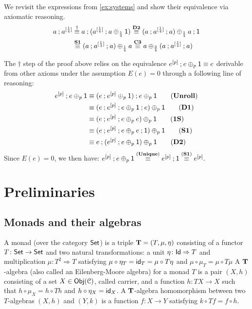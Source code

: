 \begin{example} We revisit the expressions from \cref{ex:systems} and show their equivalence via axiomatic reasoning.
\begin{align*}
     a \mathbin{;} a^{[\frac{1}{4}]} &\stackrel\dagger\equiv   a \mathbin{;} (a^{[\frac{1}{4}]} \mathbin{;} a \oplus_{\frac{1}{4}} \mathsf{1}) \stackrel{\textbf{D2}}\equiv  (a \mathbin{;} a^{[\frac{1}{4}]}\mathbin{;} a) \oplus_{\frac{1}{4}} a \mathbin{;} \mathsf{1}\\  &\stackrel{\textbf{S1}}\equiv (a \mathbin{;} a^{[\frac{1}{4}]}\mathbin{;} a) \oplus_{\frac{1}{4}} a \stackrel{\textbf{C3}}\equiv a \oplus_{\frac{3}{4}} (a \mathbin{;} a^{[\frac{1}{4}]}\mathbin{;} a)
\end{align*}

The $\dagger$ step of the proof above relies on the equivalence $e^{[p]}\mathbin{;} e \oplus_p \mathsf{1} \equiv e$ derivable from other axioms under the assumption $E(e)=0$ through a following line of reasoning:
\begin{align*}
    e^{[p]} \seq e \oplus_p \one  &\equiv (e \seq e^{[p]} \oplus_p \one)\seq e\oplus_p \one \tag{\textbf{Unroll}}\\
    &\equiv (e \seq e^{[p]}\seq e \oplus_p \one\seq e) \oplus_p \one \tag{\textbf{D1}}\\
    &\equiv (e \seq e^{[p]}\seq e \oplus_p e) \oplus_p \one \tag{\textbf{1S}}\\
        &\equiv (e \seq e^{[p]}\seq e \oplus_p e\seq \one) \oplus_p \one \tag{\textbf{S1}}\\
    &\equiv e \seq (e^{[p]}\seq e \oplus_p \one) \oplus_p \one \tag{\textbf{D2}}
\end{align*}
Since $E(e)=0$,  we then have: 
\(
     e^{[p]} \mathbin{;} e \oplus_p \mathsf{1} \stackrel{(\textbf{Unique})}\equiv e^{[p]}\mathbin{;} \mathsf{1} 
     \stackrel{(\textbf{S1})}\equiv e^{[p]} .
\)
\end{example}
\section{Preliminaries}
\label{c4:sec:preliminaries}
\subsection{Monads and their algebras}\label{c4:subsec:monads}
A monad (over the category ${\mathsf{Set}}$) is a triple $\mathbf{T} = (T, \mu, \eta)$ consisting of a functor $T \colon {\mathsf{Set}} \to {\mathsf{Set}}$ and two natural transformations: a unit $\eta \colon \mathsf{Id} \Rightarrow T$ and multiplication $\mu \colon T^2 \Rightarrow T$ satisfying $\mu \circ \eta_T = \mathsf{id}_T=  \mu \circ T\eta$ and $\mu \circ \mu_T = \mu \circ T \mu$
A $\mathbf{T}$-algebra (also called an Eilenberg-Moore algebra) for a monad $T$ is a pair $(X, h)$ consisting of a set $X \in \mathsf{Obj}(\mathcal{C})$, called carrier, and a function $h \colon T X \to X$ such that $h \circ \mu_X = h \circ Th$ and $h \circ \eta_X = \mathsf{id}_X$. A $\mathbf{T}$-algebra homomorphism between two $T$-algebras $(X,h)$ and $(Y,k)$ is a function 	$f \colon X \to Y$ satisfying $k \circ Tf = f \circ h$.

